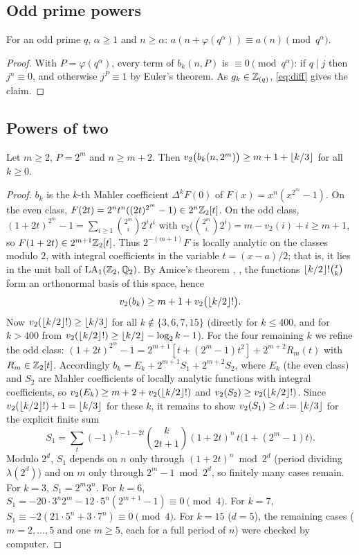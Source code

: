 \documentclass[11pt]{amsart}
\begin{document}
\subsection{Odd prime powers}
\begin{proposition}\label{prop:odd}
For an odd prime $q$, $\alpha\ge1$ and $n\ge\alpha$: $a(n+\varphi(q^\alpha))\equiv a(n)\pmod{q^\alpha}$.
\end{proposition}
\begin{proof}
With $P=\varphi(q^\alpha)$, every term of $b_k(n,P)$ is $\equiv0\pmod{q^\alpha}$: if $q\mid j$ then $j^n\equiv0$, and otherwise $j^P\equiv1$ by Euler's theorem. As $g_k\in\mathbb{Z}_{(q)}$, \eqref{eq:diff} gives the claim.
\end{proof}

\subsection{Powers of two}
\begin{lemma}\label{lem:B}
Let $m\ge2$, $P=2^m$ and $n\ge m+2$. Then $v_2\bigl(b_k(n,2^m)\bigr)\ge m+1+\left\lfloor k/3\right\rfloor$ for all $k\ge0$.
\end{lemma}
\begin{proof}
$b_k$ is the $k$-th Mahler coefficient $\Delta^kF(0)$ of $F(x)=x^n(x^{2^m}-1)$. On the even class, $F(2t)=2^nt^n((2t)^{2^m}-1)\in2^n\mathbb{Z}_2[t]$. On the odd class, $(1+2t)^{2^m}-1=\sum_{i\ge1}\binom{2^m}i2^it^i$ with $v_2\bigl(\binom{2^m}i2^i\bigr)=m-v_2(i)+i\ge m+1$, so $F(1+2t)\in2^{m+1}\mathbb{Z}_2[t]$. Thus $2^{-(m+1)}F$ is locally analytic on the classes modulo $2$, with integral coefficients in the variable $t=(x-a)/2$; that is, it lies in the unit ball of $\mathrm{LA}_1(\mathbb{Z}_2,\mathbb{Q}_2)$. By Amice's theorem \cite{amice1964}, \cite[Th.~I.4.7]{colmez2010}, the functions $\left\lfloor k/2\right\rfloor!\binom xk$ form an orthonormal basis of this space, hence
\begin{equation}\label{eq:amice}
v_2(b_k)\ge m+1+v_2\bigl(\left\lfloor k/2\right\rfloor!\bigr).
\end{equation}
Now $v_2(\left\lfloor k/2\right\rfloor!)\ge\left\lfloor k/3\right\rfloor$ for all $k\notin\{3,6,7,15\}$ (directly for $k\le400$, and for $k>400$ from $v_2(\left\lfloor k/2\right\rfloor!)\ge\left\lfloor k/2\right\rfloor-\log_2k-1$). For the four remaining $k$ we refine the odd class: $(1+2t)^{2^m}-1=2^{m+1}[t+(2^m-1)t^2]+2^{m+2}R_m(t)$ with $R_m\in\mathbb{Z}_2[t]$. Accordingly $b_k=E_k+2^{m+1}S_1+2^{m+2}S_2$, where $E_k$ (the even class) and $S_2$ are Mahler coefficients of locally analytic functions with integral coefficients, so $v_2(E_k)\ge m+2+v_2(\left\lfloor k/2\right\rfloor!)$ and $v_2(S_2)\ge v_2(\left\lfloor k/2\right\rfloor!)$. Since $v_2(\left\lfloor k/2\right\rfloor!)+1=\left\lfloor k/3\right\rfloor$ for these $k$, it remains to show $v_2(S_1)\ge d:=\left\lfloor k/3\right\rfloor$ for the explicit finite sum
\[ S_1=\sum_{t}(-1)^{k-1-2t}\binom k{2t+1}(1+2t)^n\,t\bigl(1+(2^m-1)t\bigr). \]
Modulo $2^d$, $S_1$ depends on $n$ only through $(1+2t)^n\bmod 2^d$ (period dividing $\lambda(2^d)$) and on $m$ only through $2^m-1\bmod2^d$, so finitely many cases remain. For $k=3$, $S_1=2^m3^n$. For $k=6$, $S_1=-20\cdot3^n2^m-12\cdot5^n(2^{m+1}-1)\equiv0\pmod4$. For $k=7$, $S_1\equiv-2(21\cdot5^n+3\cdot7^n)\equiv0\pmod4$. For $k=15$ ($d=5$), the remaining cases ($m=2,\dots,5$ and one $m\ge5$, each for a full period of $n$) were checked by computer.
\end{proof}
\end{document}
